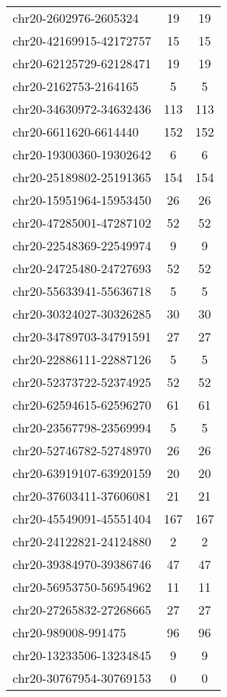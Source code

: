 \documentclass[10pt,letterpaper]{article}
\begin{document}
{\begin{longtable}{lSS}
	chr20-2602976-2605324   & 19     & 19       \\
	chr20-42169915-42172757 & 15     & 15       \\
	chr20-62125729-62128471 & 19     & 19       \\
	chr20-2162753-2164165   & 5      & 5        \\
	chr20-34630972-34632436 & 113    & 113      \\
	chr20-6611620-6614440   & 152    & 152      \\
	chr20-19300360-19302642 & 6      & 6        \\
	chr20-25189802-25191365 & 154    & 154      \\
	chr20-15951964-15953450 & 26     & 26       \\
	chr20-47285001-47287102 & 52     & 52       \\
	chr20-22548369-22549974 & 9      & 9        \\
	chr20-24725480-24727693 & 52     & 52       \\
	chr20-55633941-55636718 & 5      & 5        \\
	chr20-30324027-30326285 & 30     & 30       \\
	chr20-34789703-34791591 & 27     & 27       \\
	chr20-22886111-22887126 & 5      & 5        \\
	chr20-52373722-52374925 & 52     & 52       \\
	chr20-62594615-62596270 & 61     & 61       \\
	chr20-23567798-23569994 & 5      & 5        \\
	chr20-52746782-52748970 & 26     & 26       \\
	chr20-63919107-63920159 & 20     & 20       \\
	chr20-37603411-37606081 & 21     & 21       \\
	chr20-45549091-45551404 & 167    & 167      \\
	chr20-24122821-24124880 & 2      & 2        \\
	chr20-39384970-39386746 & 47     & 47       \\
	chr20-56953750-56954962 & 11     & 11       \\
	chr20-27265832-27268665 & 27     & 27       \\
	chr20-989008-991475     & 96     & 96       \\
	chr20-13233506-13234845 & 9      & 9        \\
	chr20-30767954-30769153 & 0      & 0        \\

\end{longtable}}
\end{document}
